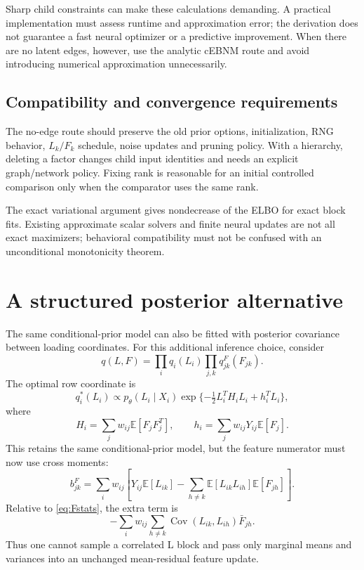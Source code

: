 \documentclass[11pt,a4paper]{article}
\newcommand{\E}{\mathbb E}
\newcommand{\Cov}{\operatorname{Cov}}
\begin{document}
Sharp child constraints can make these calculations demanding. A practical
implementation must assess runtime and approximation error; the derivation
does not guarantee a fast neural optimizer or a predictive improvement.
When there are no latent edges, however, use the analytic cEBNM route and
avoid introducing numerical approximation unnecessarily.

\subsection{Compatibility and convergence requirements}
The no-edge route should preserve the old prior options, initialization,
RNG behavior, \(L_k/F_k\) schedule, noise updates and pruning policy. With a
hierarchy, deleting a factor changes child input identities and needs an
explicit graph/network policy. Fixing rank is reasonable for an initial
controlled comparison only when the comparator uses the same rank.

The exact variational argument gives nondecrease of the ELBO for exact
block fits. Existing approximate scalar solvers and finite neural updates
are not all exact maximizers; behavioral compatibility must not be confused
with an unconditional monotonicity theorem.

\clearpage
\section{A structured posterior alternative}
\label{sec:structured}
The same conditional-prior model can also be fitted with posterior covariance
between loading coordinates. For this additional inference choice, consider
\[
q(L,F)=\prod_iq_i(L_i)\prod_{j,k}q^F_{jk}(F_{jk}).
\]
The optimal row coordinate is
\begin{equation}
q_i^*(L_i)\propto p_\theta(L_i\mid X_i)
\exp\{-\tfrac12L_i^TH_iL_i+h_i^TL_i\},
\label{eq:rowblock}
\end{equation}
where
\[
H_i=\sum_jw_{ij}\E[F_jF_j^T],\qquad
h_i=\sum_jw_{ij}Y_{ij}\E[F_j].
\]
This retains the same conditional-prior model, but the feature numerator
must now use cross moments:
\begin{equation}
b^F_{jk}=\sum_iw_{ij}\left[
Y_{ij}\E[L_{ik}]-\sum_{h\ne k}\E[L_{ik}L_{ih}]\E[F_{jh}]\right].
\label{eq:cross}
\end{equation}
Relative to \eqref{eq:Fstats}, the extra term is
\[
-\sum_iw_{ij}\sum_{h\ne k}\Cov(L_{ik},L_{ih})\bar F_{jh}.
\]
Thus one cannot sample a correlated L block and pass only marginal means
and variances into an unchanged mean-residual feature update.
\end{document}
